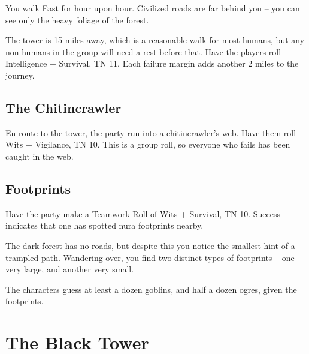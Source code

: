 \begin{multicols}{2}
\begin{boxtext}

  \noindent
  You walk East for hour upon hour.
  Civilized roads are far behind you -- you can see only the heavy foliage of the forest.

\end{boxtext}

\noindent
The tower is 15 miles away, which is a reasonable walk for most humans, but any non-humans in the group will need a rest before that.
Have the players roll Intelligence + Survival, TN 11.
Each failure margin adds another 2 miles to the journey.%

\subsection{The Chitincrawler}

En route to the tower, the party run into a chitincrawler's web.
Have them roll Wits + Vigilance, TN 10.
This is a group roll, so everyone who fails has been caught in the web.

\chitincrawler

\subsection{Footprints}

Have the party make a Teamwork Roll of Wits + Survival, TN 10.
Success indicates that one has spotted nura footprints nearby.

\begin{boxtext}

  The dark forest has no roads, but despite this you notice the smallest hint of a trampled path.
  Wandering over, you find two distinct types of footprints -- one very large, and another very small.

\end{boxtext}

The characters guess at least a dozen goblins, and half a dozen ogres, given the footprints.

\end{multicols}

\section{The Black Tower}


